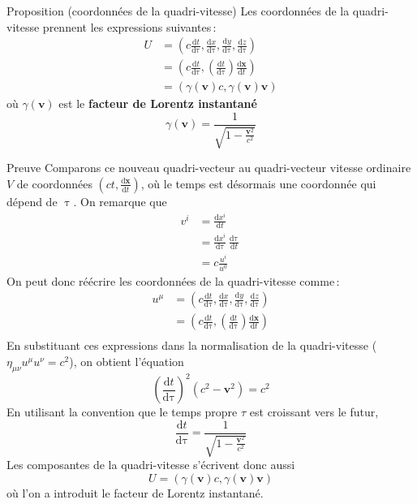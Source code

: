         \begin{omed}{Proposition (coordonnées de la quadri-vitesse)}
            Les coordonnées de la quadri-vitesse prennent les expressions suivantes :
            \begin{align*}
                U 
                &= \left(c \frac{\text{d}t}{\text{d}\uptau }, \frac{\text{d}x}{\text{d}\uptau } , \frac{\text{d}y}{\text{d}\uptau } , \frac{\text{d}z}{\text{d}\uptau } \right) \\
                &= \left(c \frac{\text{d}t}{\text{d}\uptau } , \left(\frac{\text{d}t}{\text{d}\uptau }\right) \frac{\text{d}\mathbf{x}}{\text{d}t} \right) \\
                &= \left(\gamma(\mathbf{v}) c, \gamma(\mathbf{v}) \mathbf{v}\right)
            \end{align*}
            où $\gamma(\mathbf{v})$ est le \textbf{facteur de Lorentz instantané}
            \[ \gamma(\mathbf{v}) = \frac{1}{\sqrt{1 - \frac{\mathbf{v}^2}{c^2}}} \]   
        \end{omed}

        \begin{demo}{Preuve}
            Comparons ce nouveau quadri-vecteur au quadri-vecteur vitesse ordinaire $V$ de coordonnées $(ct, \frac{\text{d}\mathbf{x}}{\text{d}t})$, où le temps est désormais une coordonnée qui dépend de $\uptau$. On remarque que
        \begin{align*}
            v^{i} &= \frac{\text{d}x^i}{\text{d}t} \\
            &= \frac{\text{d}x^i}{\text{d}\uptau} \frac{\text{d}\uptau }{\text{d}t} \\
            &= c \frac{u^i}{u^0} 
        \end{align*}
        On peut donc réécrire les coordonnées de la quadri-vitesse comme :
        \begin{align*}
            u^{\mu} 
            &= \left(c \frac{\text{d}t}{\text{d}\uptau }, \frac{\text{d}x}{\text{d}\uptau } , \frac{\text{d}y}{\text{d}\uptau } , \frac{\text{d}z}{\text{d}\uptau } \right) \\
            &= \left(c \frac{\text{d}t}{\text{d}\uptau } , \left(\frac{\text{d}t}{\text{d}\uptau }\right) \frac{\text{d}\mathbf{x}}{\text{d}t} \right) \\
        \end{align*}
        En substituant ces expressions dans la normalisation de la quadri-vitesse ($\eta_{\mu\nu} u^{\mu} u^{\nu} = c^2$), on obtient l’équation 
        \[ \left(\frac{\text{d}t}{\text{d}\uptau} \right)^2 (c^2 - \mathbf{v}^2) = c^2 \]   
        En utilisant la convention que le temps propre $\tau$ est croissant vers le futur, 
        \[ \frac{\text{d}t}{\text{d}\uptau} = \frac{1}{\sqrt{1 - \frac{\mathbf{v}^2}{c^2}}} \]
        Les composantes de la quadri-vitesse s’écrivent donc aussi 
        \[ U = \left(\gamma(\mathbf{v}) c, \gamma(\mathbf{v}) \mathbf{v}\right) \]   
        où l’on a introduit le facteur de Lorentz instantané.
        \end{demo}

